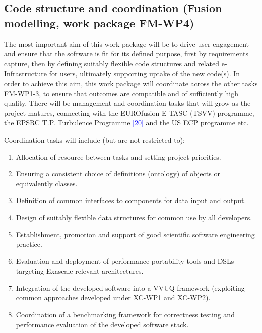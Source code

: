 \documentclass[a4paper]{article}
\newcommand\textstyleInternetlink[1]{\textcolor{blue}{#1}}
\newcommand\liststyleWWNumxii{%
\renewcommand\theenumi{\arabic{enumi}}
\renewcommand\theenumii{\alph{enumii}}
\renewcommand\theenumiii{\roman{enumiii}}
\renewcommand\theenumiv{\arabic{enumiv}}
\renewcommand\labelenumi{\theenumi.}
\renewcommand\labelenumii{\theenumii.}
\renewcommand\labelenumiii{\theenumiii.}
\renewcommand\labelenumiv{\theenumiv.}
}
\begin{document}
\subsection[]{\rmfamily\bfseries }
\subsection[Code structure and coordination (Fusion modelling, work package
FM-WP4)]{\textbf{\textcolor[rgb]{0.12156863,0.28627452,0.49019608}{Code 
structure and coordination
}}\textcolor[rgb]{0.12156863,0.28627452,0.49019608}{(Fusion modelling, work 
package
}\textbf{\textcolor[rgb]{0.12156863,0.28627452,0.49019608}{FM-WP4}}\textcolor[rg
b]{0.12156863,0.28627452,0.49019608}{)}}

\bigskip

The most important aim of this work package will be to drive user engagement 
and ensure that the software is fit for its
defined purpose, first by requirements capture, then by defining suitably 
flexible code structures and related
e-Infrastructure for users, ultimately supporting uptake of the new code(s). In 
order to achieve this aim, this work
package will coordinate across the other tasks FM-WP1-3, to ensure that 
outcomes are compatible and of sufficiently
high quality. There will be management and coordination tasks that will grow as 
the project matures,
{connecting with the EUROfusion E-TASC (TSVV) programme, the EPSRC T.P. 
Turbulence Programme
}\href{https://www.york.ac.uk/physics/news/departmentalnews/plasma-fusion/major-
grant-award-supports-fusion-energy-research/}{\textstyleInternetlink{{[20]}}}{
and the }US ECP programme etc.


\bigskip

Coordination tasks will include (but are not restricted to):


\bigskip

\liststyleWWNumxii
\begin{enumerate}
\item Allocation of resource between tasks and setting project priorities.
\item Ensuring a consistent choice of definitions (ontology) of objects or 
equivalently classes.
\item Definition of common interfaces to components for data input and output. 
\item Design of suitably flexible data structures for common use by all 
developers.
\item Establishment, promotion and support of good scientific software 
engineering practice.
\item Evaluation and deployment of performance portability tools and DSLs 
targeting Exascale-relevant architectures.
\item Integration of the developed software into a VVUQ framework (exploiting 
common approaches developed under XC-WP1
and XC-WP2).
\item Coordination of a benchmarking framework for correctness testing and 
performance evaluation of the developed
software stack.
\end{enumerate}
\end{document}
